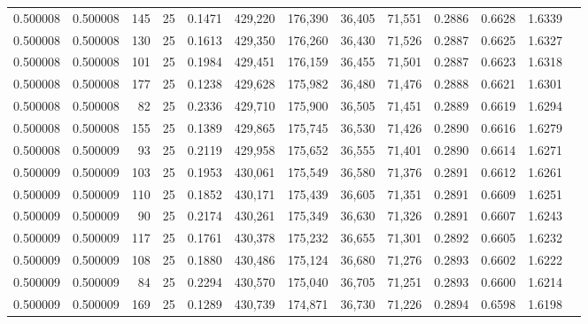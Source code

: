 \begin{tabular}{rrrrrrrrrrrrr}
0.500008 & 0.500008 &   145 &  25 &                                     0.1471 & 429,220 & 176,390 &  36,405 &  71,551 & 0.2886 & 0.6628 & 1.6339 \\
0.500008 & 0.500008 &   130 &  25 &                                     0.1613 & 429,350 & 176,260 &  36,430 &  71,526 & 0.2887 & 0.6625 & 1.6327 \\
0.500008 & 0.500008 &   101 &  25 &                                     0.1984 & 429,451 & 176,159 &  36,455 &  71,501 & 0.2887 & 0.6623 & 1.6318 \\
0.500008 & 0.500008 &   177 &  25 &                                     0.1238 & 429,628 & 175,982 &  36,480 &  71,476 & 0.2888 & 0.6621 & 1.6301 \\
0.500008 & 0.500008 &    82 &  25 &                                     0.2336 & 429,710 & 175,900 &  36,505 &  71,451 & 0.2889 & 0.6619 & 1.6294 \\
0.500008 & 0.500008 &   155 &  25 &                                     0.1389 & 429,865 & 175,745 &  36,530 &  71,426 & 0.2890 & 0.6616 & 1.6279 \\
0.500008 & 0.500009 &    93 &  25 &                                     0.2119 & 429,958 & 175,652 &  36,555 &  71,401 & 0.2890 & 0.6614 & 1.6271 \\
0.500009 & 0.500009 &   103 &  25 &                                     0.1953 & 430,061 & 175,549 &  36,580 &  71,376 & 0.2891 & 0.6612 & 1.6261 \\
0.500009 & 0.500009 &   110 &  25 &                                     0.1852 & 430,171 & 175,439 &  36,605 &  71,351 & 0.2891 & 0.6609 & 1.6251 \\
0.500009 & 0.500009 &    90 &  25 &                                     0.2174 & 430,261 & 175,349 &  36,630 &  71,326 & 0.2891 & 0.6607 & 1.6243 \\
0.500009 & 0.500009 &   117 &  25 &                                     0.1761 & 430,378 & 175,232 &  36,655 &  71,301 & 0.2892 & 0.6605 & 1.6232 \\
0.500009 & 0.500009 &   108 &  25 &                                     0.1880 & 430,486 & 175,124 &  36,680 &  71,276 & 0.2893 & 0.6602 & 1.6222 \\
0.500009 & 0.500009 &    84 &  25 &                                     0.2294 & 430,570 & 175,040 &  36,705 &  71,251 & 0.2893 & 0.6600 & 1.6214 \\
0.500009 & 0.500009 &   169 &  25 &                                     0.1289 & 430,739 & 174,871 &  36,730 &  71,226 & 0.2894 & 0.6598 & 1.6198 \\

\end{tabular}
